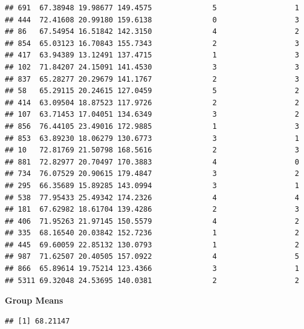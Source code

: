 \documentclass[]{article}
\newenvironment{Shaded}{\begin{snugshade}}{\end{snugshade}}
\newcommand{\KeywordTok}[1]{\textcolor[rgb]{0.13,0.29,0.53}{\textbf{#1}}}
\newcommand{\StringTok}[1]{\textcolor[rgb]{0.31,0.60,0.02}{#1}}
\newcommand{\OperatorTok}[1]{\textcolor[rgb]{0.81,0.36,0.00}{\textbf{#1}}}
\newcommand{\NormalTok}[1]{#1}
\begin{document}
\begin{verbatim}
## 691  67.38948 19.98677 149.4575              5                  1
## 444  72.41608 20.99180 159.6138              0                  3
## 86   67.54954 16.51842 142.3150              4                  2
## 854  65.03123 16.70843 155.7343              2                  3
## 417  63.94389 13.12491 137.4715              1                  3
## 102  71.84207 24.15091 141.4530              3                  3
## 837  65.28277 20.29679 141.1767              2                  3
## 58   65.29115 20.24615 127.0459              5                  2
## 414  63.09504 18.87523 117.9726              2                  2
## 107  63.71453 17.04051 134.6349              3                  2
## 856  76.44105 23.49016 172.9885              1                  3
## 853  63.89230 18.06279 130.6773              3                  1
## 10   72.81769 21.50798 168.5616              2                  3
## 881  72.82977 20.70497 170.3883              4                  0
## 734  76.07529 20.90615 179.4847              3                  2
## 295  66.35689 15.89285 143.0994              3                  1
## 538  77.95433 25.49342 174.2326              4                  4
## 181  67.62982 18.61704 139.4286              2                  3
## 406  71.95263 21.97145 150.5579              4                  2
## 335  68.16540 20.03842 152.7236              1                  2
## 445  69.60059 22.85132 130.0793              1                  2
## 987  71.62507 20.40505 157.0922              4                  5
## 866  65.89614 19.75214 123.4366              3                  1
## 5311 69.32048 24.53695 140.0381              2                  2
\end{verbatim}

\textbf{Group Means}

\begin{Shaded}
\end{Shaded}

\begin{verbatim}
## [1] 68.21147
\end{verbatim}

\begin{Shaded}
\end{Shaded}
\end{document}
